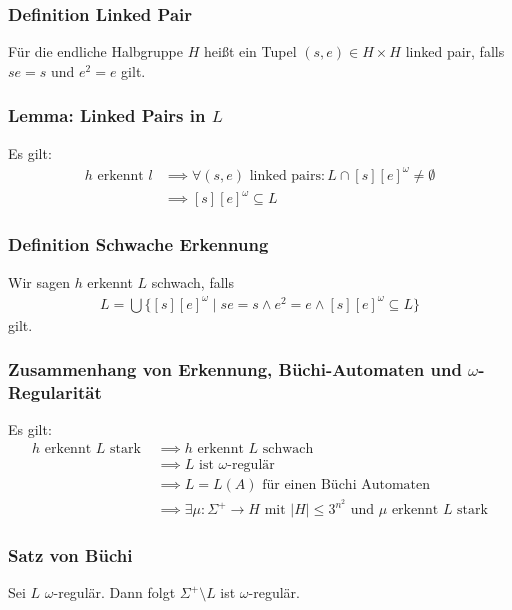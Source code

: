 \documentclass[12pt, german]{article}
\newcommand{\pom}{^{\omega}}
\newcommand{\splu}{\Sigma^{+}}
\begin{document}
\subsubsection{Definition Linked Pair}
	Für die endliche Halbgruppe $H$ hei\ss t ein Tupel $(s, e) \in H \times H$ linked pair, falls $se = s$ und $e^2 = e$ gilt.

\subsubsection{Lemma: Linked Pairs in $L$ \label{lemmaa}}
	Es gilt: 
	\begin{align*}
		h \text{ erkennt } l &\implies \forall (s,e) \text{ linked pairs}: L \cap [s][e]\pom \not = \emptyset \\
		&\implies [s][e]\pom \subseteq L
	\end{align*}

\subsubsection{Definition  Schwache Erkennung}
	Wir sagen $h$ erkennt $L$ schwach, falls
	\begin{align*}
		L = \bigcup \{[s][e]\pom \mid se = s \land e^2 = e \land [s][e]\pom \subseteq L\}
	\end{align*}
	gilt.

\subsubsection{Zusammenhang von Erkennung, Büchi-Automaten und $\omega$-Regularität}
	Es gilt: 
	\begin{align*}
		h \text{ erkennt } L \text{ stark } &\implies h \text{ erkennt } L \text{ schwach } \\
		&\implies L \text{ ist $\omega$-regulär } \\
		&\implies L = L(A) \text{ für einen Büchi Automaten} \\
		&\implies \exists \mu: \splu \to H \text{ mit } |H| \leq 3^{n^2} \text{ und } \mu \text{ erkennt } L \text{ stark}
	\end{align*}

\subsubsection{Satz von Büchi}
	Sei $L$ $\omega$-regulär. Dann folgt $\splu \setminus L$ ist $\omega$-regulär. 
	
\end{document}
